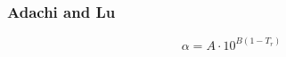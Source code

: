 \subsubsection{Adachi and Lu \cite{adachiLu}}

\begin{equation}
\alpha = A\cdot {10}^{B\left(1-T_r\right)}
\end{equation}